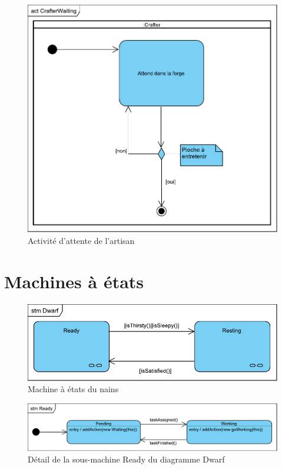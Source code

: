 \documentclass[a4paper]{report}
\begin{document}
\begin{figure}[H]
    \center
    \includegraphics[width=15cm]{img/act/CrafterWaiting}
    \caption{Activité d'attente de l'artisan}
		\label{}
\end{figure}

\clearpage
\section*{Machines à états}

\begin{figure}[bh!]
    \center
    \includegraphics[width=15cm]{img/stm/Dwarf}
    \caption{Machine à états du nains}
		\label{}
\end{figure}


\begin{figure}[bh!]
    \center
    \includegraphics[width=15cm]{img/stm/Ready}
    \caption{Détail de la sous-machine Ready du diagramme Dwarf}
		\label{}
\end{figure}
\end{document}
